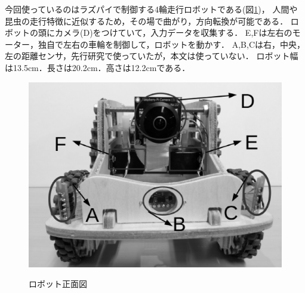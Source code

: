 今回使っているのはラズパイで制御する4輪走行ロボットである(図\ref{robot_img})，
人間や昆虫の走行特徴に近似するため，その場で曲がり，方向転換が可能である．
ロボットの頭にカメラ(D)をつけていて，入力データを収集する．
E,Fは左右のモーター，独自で左右の車輪を制御して，ロボットを動かす．
A,B,Cは右，中央，左の距離センサ，先行研究で使っていたが，本文は使っていない．
ロボット幅は13.5cm．長さは20.2cm．高さは12.2cmである．

\vspace{-4mm}
\begin{figure}[htb]
    \centering
    \includegraphics[width=0.4\linewidth]{robot1.eps}
　　\label{robot_img}
    \caption{ロボット正面図}
\end{figure}




